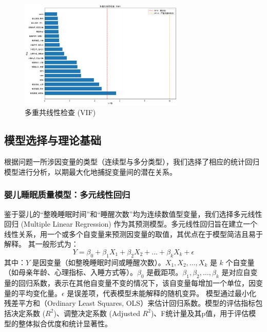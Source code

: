 \documentclass[withoutpreface,bwprint]{cumcmthesis}
\begin{document}
\begin{figure}[htbp]
    \centering
    \includegraphics[width=0.7\textwidth]{figures/multicollinearity_vif.png}
    \caption{多重共线性检查 (VIF)}
    \label{fig:multicollinearity_vif}
\end{figure}

\subsection{模型选择与理论基础}
根据问题一所涉因变量的类型（连续型与多分类型），我们选择了相应的统计回归模型进行分析，以期最大化地捕捉变量间的潜在关系。

\subsubsection{婴儿睡眠质量模型：多元线性回归}
鉴于婴儿的“整晚睡眠时间”和“睡醒次数”均为连续数值型变量，我们选择多元线性回归 (Multiple Linear Regression) 作为其预测模型。多元线性回归旨在建立一个线性关系，用一个或多个自变量来预测因变量的取值，其优点在于模型简洁且易于解释。
其一般形式为：
$$ Y = \beta_0 + \beta_1 X_1 + \beta_2 X_2 + \dots + \beta_k X_k + \epsilon $$
其中：$Y$ 是因变量（如整晚睡眠时间或睡醒次数）。$X_1, X_2, \dots, X_k$ 是 $k$ 个自变量（如母亲年龄、心理指标、入睡方式等）。$\beta_0$ 是截距项。$\beta_1, \beta_2, \dots, \beta_k$ 是对应自变量的回归系数，表示在其他自变量不变的情况下，该自变量每增加一个单位，因变量的平均变化量。$\epsilon$ 是误差项，代表模型未能解释的随机变异。
模型通过最小化残差平方和（Ordinary Least Squares, OLS）来估计回归系数。模型的评估指标包括决定系数 ($R^2$)、调整决定系数 (Adjusted $R^2$)、F统计量及其p值，用于评估模型的整体拟合优度和统计显著性。
\end{document}
